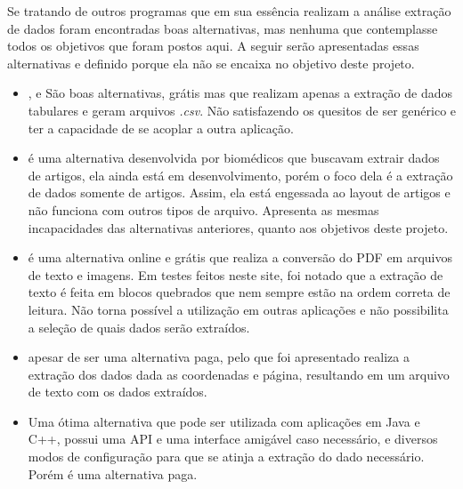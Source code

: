 \begin{enumerate}
Se tratando de outros programas que em sua essência realizam a análise extração de dados foram encontradas boas alternativas, mas nenhuma que contemplasse todos os objetivos que foram postos aqui. A seguir serão apresentadas essas alternativas e definido porque ela não se encaixa no objetivo deste projeto.

\begin{itemize}
    \item \cite{pdft}, \cite{fpdfc} e \cite{tabula} São boas alternativas, grátis mas que realizam apenas a extração de dados tabulares e geram arquivos \textit{.csv}. Não satisfazendo os quesitos de ser genérico e ter a capacidade de se acoplar a outra aplicação.
    
    \item \cite{lapdf} é uma alternativa desenvolvida por biomédicos que buscavam extrair dados de artigos, ela ainda está em desenvolvimento, porém o foco dela é a extração de dados somente de artigos. Assim, ela está engessada ao layout de artigos e não funciona com outros tipos de arquivo. Apresenta as mesmas incapacidades das alternativas anteriores, quanto aos objetivos deste projeto.
    
    \item \cite{epdf} é uma alternativa online e grátis que realiza a conversão do PDF em arquivos de texto e imagens. Em testes feitos neste site, foi notado que a extração de texto é feita em blocos quebrados que nem sempre estão na ordem correta de leitura. Não torna possível a utilização em outras aplicações e não possibilita a seleção de quais dados serão extraídos.
    
    \item \cite{dparser} apesar de ser uma alternativa paga, pelo que foi apresentado realiza a extração dos dados dada as coordenadas e página, resultando em um arquivo de texto com os dados extraídos. 
    
    \item \cite{ipdf} Uma ótima alternativa que pode ser utilizada com aplicações em Java e C++, possui uma API e uma interface amigável caso necessário, e diversos modos de configuração para que se atinja a extração do dado necessário. Porém é uma alternativa paga.
    
\end{itemize}

\end{enumerate}